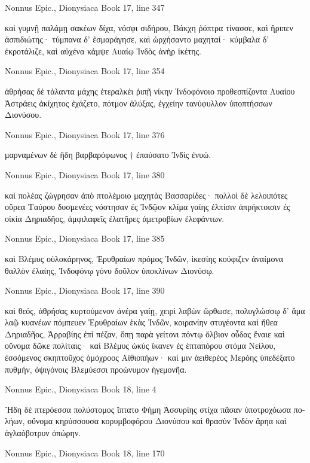 \documentclass[12pt,letterpaper,twoside,final]{memoir}
\begin{document}
\begin{greek}
Nonnus Epic., Dionysiaca 
Book 17, line 347

καὶ γυμνῇ παλάμῃ σακέων δίχα, νόσφι σιδήρου, 
Βάκχη ῥόπτρα τίνασσε, καὶ ἤριπεν ἀσπιδιώτης· 
τύμπανα δ' ἐσμαράγησε, καὶ ὠρχήσαντο μαχηταί· 
κύμβαλα δ' ἐκροτάλιζε, καὶ αὐχένα κάμψε Λυαίῳ 
Ἰνδὸς ἀνὴρ ἱκέτης. 



Nonnus Epic., Dionysiaca 
Book 17, line 354

ἀθρήσας δὲ τάλαντα μάχης ἑτεραλκέι ῥιπῇ 
νίκην Ἰνδοφόνοιο προθεσπίζοντα Λυαίου 
Ἀστράεις ἀκίχητος ἐχάζετο, πότμον ἀλύξας, 
ἐγχείην τανύφυλλον ὑποπτήσσων Διονύσου. 



Nonnus Epic., Dionysiaca 
Book 17, line 376

                                           μαρναμένων δὲ 
ἤδη βαρβαρόφωνος † ἐπαύσατο Ἰνδὶς ἐνυώ. 



Nonnus Epic., Dionysiaca 
Book 17, line 380

καὶ πολέας ζώγρησαν ἀπὸ πτολέμοιο μαχητὰς 
Βασσαρίδες· πολλοὶ δὲ λελοιπότες οὔρεα Ταύρου   
δυσμενέες νόστησαν ἐς Ἰνδῷον κλίμα γαίης 
ἐλπίσιν ἀπρήκτοισιν ἐς οἰκία Δηριαδῆος, 
ἀμφιλαφεῖς ἐλατῆρες ἀμετροβίων ἐλεφάντων. 



Nonnus Epic., Dionysiaca 
Book 17, line 385

καὶ Βλέμυς οὐλοκάρηνος, Ἐρυθραίων πρόμος Ἰνδῶν, 
ἱκεσίης κούφιζεν ἀναίμονα θαλλὸν ἐλαίης, 
Ἰνδοφόνῳ γόνυ δοῦλον ὑποκλίνων Διονύσῳ. 



Nonnus Epic., Dionysiaca 
Book 17, line 390

καὶ θεός, ἀθρήσας κυρτούμενον ἀνέρα γαίῃ, 
χειρὶ λαβὼν ὤρθωσε, πολυγλώσσῳ δ' ἅμα λαῷ 
κυανέων πόμπευεν Ἐρυθραίων ἑκὰς Ἰνδῶν, 
κοιρανίην στυγέοντα καὶ ἤθεα Δηριαδῆος, 
Ἀρραβίης ἐπὶ πέζαν, ὅπῃ παρὰ γείτονι πόντῳ 
ὄλβιον οὖδας ἔναιε καὶ οὔνομα δῶκε πολίταις· 
καὶ Βλέμυς ὠκὺς ἵκανεν ἐς ἑπταπόρου στόμα Νείλου, 
ἐσσόμενος σκηπτοῦχος ὁμόχροος Αἰθιοπήων· 
καί μιν ἀειθερέος Μερόης ὑπεδέξατο πυθμήν, 
ὀψιγόνοις Βλεμύεσσι προώνυμον ἡγεμονῆα. 



Nonnus Epic., Dionysiaca 
Book 18, line 4

Ἤδη δὲ πτερόεσσα πολύστομος ἵπτατο Φήμη 
Ἀσσυρίης στίχα πᾶσαν ὑποτροχόωσα πολήων, 
οὔνομα κηρύσσουσα κορυμβοφόρου Διονύσου 
καὶ θρασὺν Ἰνδὸν ἄρηα καὶ ἀγλαόβοτρυν ὀπώρην. 



Nonnus Epic., Dionysiaca 
Book 18, line 170


\end{greek}
\end{document}
